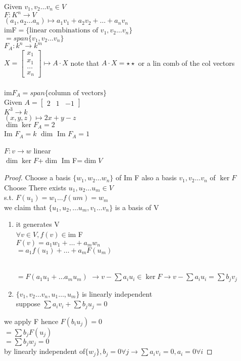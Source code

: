 \documentclass{article}
\newcommand\m[1]{\begin{bmatrix}#1\end{bmatrix}}
\newcommand{\cd}{\cdot}
\newcommand{\as}{a_1,a_2\dots a_n}
\newcommand{\vs}{v_1,v_2\dots v_n}
\newcommand{\ws}{w_1,w_2\dots w_n}
\newcommand{\brac}[1]{\{#1\}}
\newcommand{\lincom}{a_1v_1+a_2v_2+\dots+a_nv_n}
\newcommand{\li}{linearly independent }
\begin{document}
Given $\vs \in V$
\\$F:K^n \to V$\\
$(\as) \mapsto \lincom$
\\imF$=\brac{\text{linear combinations of }\vs}$\\
$=span \brac{\vs}$\\
$F_A:k^n\to k^m$\\
$X=\m{x_1\\x_1\\\dots\\x_n}\mapsto A\cd X$
note that $A\cd X=\star\star$ or a lin comb of the col vectors\\
\\im$F_A=span\brac{\text{column of vectors}}$
\\Given $A=\m{2&1&-1}$\\
$K^3\to k$\\
$(x,y,z) \mapsto 2x+y-z$\\
$\dim \ker F_A=2$\\Im $F_A=k$ $\dim $ Im $F_A=1$
\begin{theorem}
    $F: v \to w$ linear\\
    $\dim \ker F$+$\dim $ Im F=$\dim V$
\end{theorem}
\begin{proof}
    Choose a basis $\brac{\ws}$ of Im F also a basis $\vs$ of $\ker F$ Choose There exists $u_1,u_2\dots u_m \in V$\\s.t. $F(u_1)=w_1\dots f(um)=w_m$\\
    we claim that $\brac{u_1,u_2,\dots u_m,v_1\dots v_n}$ is a basis of V\\
    \begin{enumerate}
        \item it generates V\\
$\forall v \in V, f(v)\in $im F\\
$F(v)=a_1w_1+\dots +a_mw_n$\\
$=a_1f(u_1)+\dots+a_mF(u_m)$

\\$=F(a_1u_1+\dots a_mu_m)$
$\to v-\sum a_iu_i \in \ker F \to v-\sum a_iu_i=\sum b_jv_j$ 
\item $\brac{\vs,u_1\dots,u_m}$ is \li\\
suppose $\sum a_iv_i+\sum b_ju_j=0$\\

    \end{enumerate}
    we apply F hence $F(b_iu_j)=0$\\
    $=\sum b_j F(u_j)$\\
    $=\sum b_jw_j=0$\\
    by \li of$ \brac{w_j},b_j=0 \forall j\to\sum a_iv_i=0, a_i=0 \forall i$
    
\end{proof}
\end{document}
